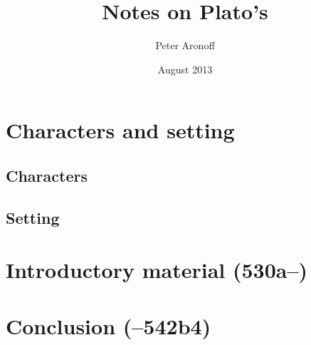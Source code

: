 \documentclass[11pt]{article}
\begin{document}
\begin{titlepage}
\title{Notes on Plato's }
\author{Peter Aronoff}
\date{August 2013}
\maketitle
\end{titlepage}

\section{Characters and setting}

\subsection{Characters}


\subsection{Setting}



\section{Introductory material (530a--)}


\section{Conclusion (--542b4)}


\newpage


\end{document}
